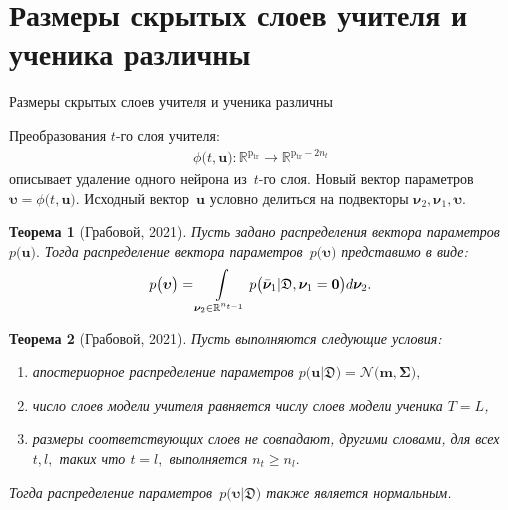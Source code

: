 \documentclass[10pt,pdf,hyperref={unicode}]{beamer}
\newtheorem{rustheorem}{Теорема}
\begin{document}
\section{Размеры скрытых слоев учителя и ученика различны}
\begin{frame}{Размеры скрытых слоев учителя и ученика различны}

Преобразования $t$-го слоя учителя:
\[
\begin{aligned}
\phi\bigr(t, \mathbf{u}\bigr) : \mathbb{R}^{\text{p}_{\text{tr}}} \to \mathbb{R}^{\text{p}_{\text{tr}}-2n_t}
\end{aligned}
\]
описывает удаление одного нейрона из~$t$-го слоя. Новый вектор параметров $\bm{\upsilon} =  \phi\bigr(t, \mathbf{u}\bigr).$ Исходный вектор~$\mathbf{u}$ условно делиться на подвекторы $\bm{\nu}_2, {\bm{\nu}}_1, \bm{\upsilon}.$

\begin{rustheorem}[Грабовой, 2021]
\justifying
Пусть задано распределения вектора параметров~$p\bigr(\mathbf{u}\bigr).$ Тогда распределение вектора параметров~$p\bigr(\bm{\upsilon}\bigr)$ представимо в виде:
\[
\setlength\abovedisplayskip{0pt}
p\bigr(\bm{\upsilon}\bigr)  = \int\limits_{ \bm{\nu}_2 \in \mathbb{R}^{n_{t-1}}}p\bigr(\bar{\bm{\nu}}_1|\mathfrak{D}, \bm{\nu}_1=\mathbf{0}\bigr) d \bm{\nu}_2.
\setlength\belowdisplayskip{0pt}
\]
\end{rustheorem}

\begin{rustheorem}[Грабовой, 2021]
\justifying
Пусть выполняются следующие условия:
\begin{enumerate}[1)]
\item апостериорное распределение параметров $p\bigr(\mathbf{u}|\mathfrak{D}\bigr) = \mathcal{N}\bigr(\mathbf{m}, \bm{\Sigma}\bigr),$
\item число слоев модели учителя равняется числу слоев модели ученика $T=L$,
\item размеры соответствующих слоев не совпадают, другими словами, для всех $t, l,$ таких что $t=l,$ выполняется $n_t \geq n_l.$
\end{enumerate}
Тогда распределение параметров~$p\bigr(\bm{\upsilon}|\mathfrak{D}\bigr)$ также является нормальным.
\end{rustheorem}

\end{frame}
\end{document}
